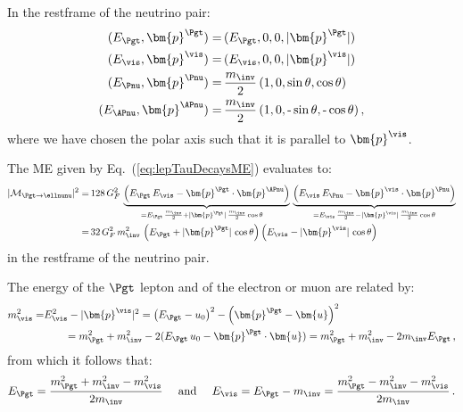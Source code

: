 In the restframe of the neutrino pair:
\begin{align}
( E_{\Pgt}, \bm{p}^{\Pgt} ) = & \, ( E_{\Pgt}, 0, 0, \vert\bm{p}^{\Pgt}\vert ) \nonumber \\
( E_{\vis}, \bm{p}^{\vis} ) = & \, ( E_{\vis}, 0, 0, \vert\bm{p}^{\vis}\vert ) \nonumber \\
( E_{\Pnu}, \bm{p}^{\Pnu} ) = & \, \frac{m_{\inv}}{2} \, ( 1, 0, \sin\theta, \cos\theta ) \nonumber \\
( E_{\APnu}, \bm{p}^{\APnu} ) = & \, \frac{m_{\inv}}{2} \, ( 1, 0, \mbox{-}\sin\theta, \mbox{-}\cos\theta ) \, , \nonumber 
\end{align}
where we have chosen the polar axis such that it is parallel to $\bm{p}^{\vis}$.

The ME given by Eq.~(\ref{eq:lepTauDecaysME}) evaluates to:
\begin{align}
\vert\mathcal{M}_{\Pgt \to \ellnunu}\vert^{2} 
 = & \, 128 \, G^{2}_{F} \, 
  \underbrace{\left( E_{\Pgt} \, E_{\vis} - \bm{p}^{\Pgt} \cdot \bm{p}^{\APnu} \right)}_{= E_{\Pgt} \, \frac{m_{\inv}}{2} + \vert\bm{p}^{\Pgt}\vert \, \frac{m_{\inv}}{2} \cos\theta \quad} \,
  \underbrace{\left( E_{\vis} \, E_{\Pnu} - \bm{p}^{\vis} \cdot \bm{p}^{\Pnu} \right)}_{= E_{\vis} \, \frac{m_{\inv}}{2} - \vert\bm{p}^{\vis}\vert \, \frac{m_{\inv}}{2} \cos\theta} \nonumber \\
 = & \, 32 \, G^{2}_{F} \, m^{2}_{\inv} \, \left( E_{\Pgt} + \vert\bm{p}^{\Pgt}\vert \, \cos\theta \right)  \left( E_{\vis} - \vert\bm{p}^{\vis}\vert \, \cos\theta \right) 
\label{eq:lepTauDecaysMErf}
\end{align}
in the restframe of the neutrino pair.

The energy of the $\Pgt$ lepton and of the electron or muon are
related by:
\begin{align}
m^{2}_{\vis} = & E_{\vis}^{2} - \vert\bm{p}^{\vis}\vert^{2} 
 = \left( E_{\Pgt} - u_{0} \right)^{2} - \left( \bm{p}^{\Pgt} - \bm{u} \right)^{2} \nonumber \\
& \qquad
 = m^{2}_{\Pgt} + m^{2}_{\inv} - 2 (E_{\Pgt} \, u_{0} - \bm{p}^{\Pgt} \cdot \bm{u}) 
 = m^{2}_{\Pgt} + m^{2}_{\inv} - 2 m_{\inv} E_{\Pgt} \, ,
\end{align}
from which it follows that:
\begin{equation}
E_{\Pgt} = \frac{m^{2}_{\Pgt} + m^{2}_{\inv} - m^{2}_{\vis}}{2
  m_{\inv}} \quad \mbox{ and } \quad E_{\vis} = E_{\Pgt} - m_{\inv} =
\frac{m^{2}_{\Pgt} - m^{2}_{\inv} - m^{2}_{\vis}}{2 m_{\inv}} \, .
\label{eq:lepTauDecaysEn}
\end{equation}


